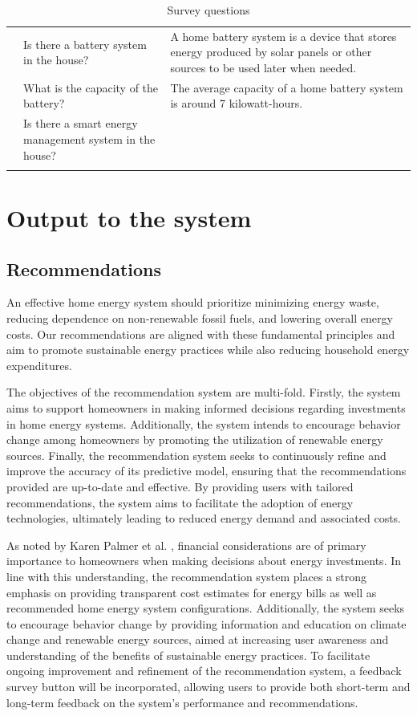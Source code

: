\begin{center}
\begin{longtable}{ | p{} | p{} | p{} | }
          & Is there a battery system in the house? & A home battery system is a device that stores energy produced by solar panels or other sources to be used later when needed. \\
          & What is the capacity of the battery? & The average capacity of a home battery system is around 7 kilowatt-hours. \\
          & Is there a smart energy management system in the house? &   \\
        \hline
    \caption{Survey questions}
    \label{tab:questions}
    \end{longtable}
\end{center}

\section{Output to the system}

\subsection{Recommendations}

An effective home energy system should prioritize minimizing energy waste, reducing dependence on non-renewable fossil fuels, and lowering overall energy costs. Our recommendations are aligned with these fundamental principles and aim to promote sustainable energy practices while also reducing household energy expenditures. 

The objectives of the recommendation system are multi-fold. 
Firstly, the system aims to support homeowners in making informed decisions regarding investments in home energy systems. 
Additionally, the system intends to encourage behavior change among homeowners by promoting the utilization of renewable energy sources. 
Finally, the recommendation system seeks to continuously refine and improve the accuracy of its predictive model, ensuring that the recommendations provided are up-to-date and effective. 
By providing users with tailored recommendations, the system aims to facilitate the adoption of energy technologies, ultimately leading to reduced energy demand and associated costs. 

As noted by Karen Palmer et al. \cite{informationgap}, financial considerations are of primary importance to homeowners when making decisions about energy investments. 
In line with this understanding, the recommendation system places a strong emphasis on providing transparent cost estimates for energy bills as well as recommended home energy system configurations. 
Additionally, the system seeks to encourage behavior change by providing information and education on climate change and renewable energy sources, aimed at increasing user awareness and understanding of the benefits of sustainable energy practices. 
To facilitate ongoing improvement and refinement of the recommendation system, a feedback survey button will be incorporated, allowing users to provide both short-term and long-term feedback on the system's performance and recommendations. 

